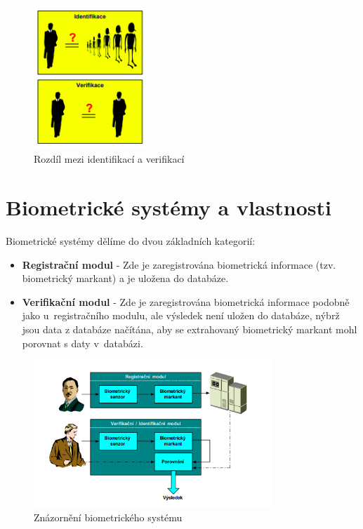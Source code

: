 \begin{figure}[!htbp]
    \centering
    \includegraphics[width=160px]{obrazky-figures/identifver.png}
    \caption{Rozdíl mezi identifikací a verifikací \cite{Drahansky}}
\end{figure}



\section{Biometrické systémy a vlastnosti}
Biometrické systémy dělíme do dvou základních kategorií: \cite{Drahansky}
\begin{itemize}
    \item \textbf{Registrační modul} - Zde je zaregistrována biometrická informace (tzv. biometrický markant) a je uložena do databáze.
    \item \textbf{Verifikační modul} - Zde je zaregistrována biometrická informace podobně jako u~registračního modulu, ale výsledek není uložen do databáze, nýbrž jsou data z databáze načítána, aby se extrahovaný biometrický markant mohl porovnat s daty v~databázi. 
\end{itemize}

\begin{figure}[!htbp]
    \centering
    \includegraphics[width=340px]{obrazky-figures/biosystem.png}
    \caption{Znázornění biometrického systému \cite{Drahansky}}
\end{figure}

